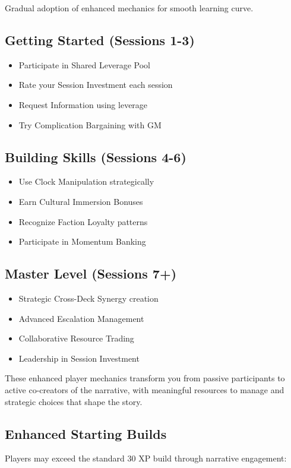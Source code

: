 Gradual adoption of enhanced mechanics for smooth learning curve.

\subsection{Getting Started (Sessions 1-3)}

\begin{itemize}
\item Participate in Shared Leverage Pool
\item Rate your Session Investment each session
\item Request Information using leverage
\item Try Complication Bargaining with GM
\end{itemize}

\subsection{Building Skills (Sessions 4-6)}

\begin{itemize}
\item Use Clock Manipulation strategically
\item Earn Cultural Immersion Bonuses
\item Recognize Faction Loyalty patterns
\item Participate in Momentum Banking
\end{itemize}

\subsection{Master Level (Sessions 7+)}

\begin{itemize}
\item Strategic Cross-Deck Synergy creation
\item Advanced Escalation Management
\item Collaborative Resource Trading
\item Leadership in Session Investment
\end{itemize}

These enhanced player mechanics transform you from passive participants to active co-creators of the narrative, with meaningful resources to manage and strategic choices that shape the story.

\subsection{Enhanced Starting Builds}
Players may exceed the standard 30 XP build through narrative engagement:

